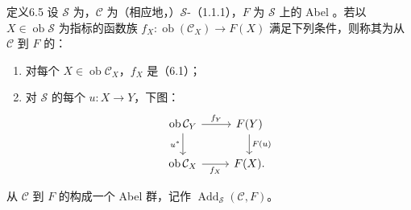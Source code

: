 \begin{SGAresult}{定义}{6.5}
设 $\mathscr S$ 为，$\mathcal C$ 为（相应地，）$\mathscr S$-（1.1.1），$F$ 为 $\mathscr S$ 上的 Abel 。若以 $X\in\operatorname{ob}\mathscr S$ 为指标的函数族 $f_X:\operatorname{ob}(\mathcal C_X)\to F(X)$ 满足下列条件，则称其为从 $\mathcal C$ 到 $F$ 的：
\begin{enumerate}
\item[(i)] 对每个 $X\in\operatorname{ob}\mathcal C_X$，$f_X$ 是（6.1）；
\item[(ii)] 对 $\mathscr S$ 的每个 $u:X\to Y$，下图：
\[\begin{tikzcd}
\operatorname{ob}\mathcal C_Y\arrow[r,"f_Y"]\arrow[d,"u^*"']&F(Y)\arrow[d,"F(u)"]\\
\operatorname{ob}\mathcal C_X\arrow[r,"f_X"']&F(X).
\end{tikzcd}\]
\end{enumerate}
从 $\mathcal C$ 到 $F$ 的构成一个 Abel 群，记作 $\operatorname{Add}_{\mathscr S}(\mathcal C,F)$。
\end{SGAresult}

